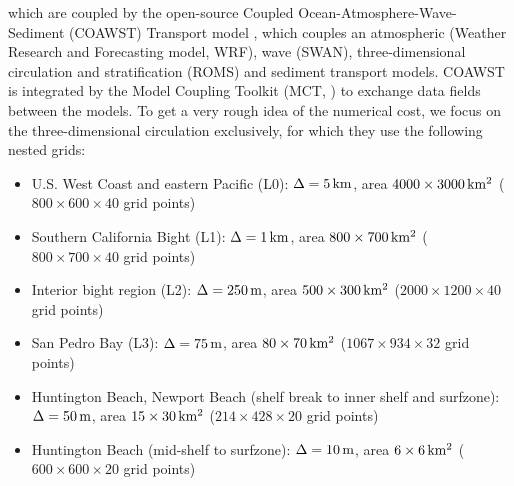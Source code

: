 \documentclass[12pt,a4paper]{article}
\begin{document}
which are coupled by the open-source Coupled Ocean-Atmosphere-Wave-Sediment (COAWST) Transport model \citep{warner2008using,web:coawst}, which couples an atmospheric (Weather Research and Forecasting model, WRF), wave (SWAN), three-dimensional circulation and stratification (ROMS) and sediment transport models. COAWST is integrated by the Model Coupling Toolkit (MCT, \citealt{web:mct}) to exchange data fields between the models. To get a very rough idea of the numerical cost, we focus on the three-dimensional circulation exclusively, for which they use the following nested grids:

\begin{itemize}
	\item U.S. West Coast and eastern Pacific (L0):  $\Delta=5\,\rm km$, area $4000\times3000\,\rm km^2$ ($800\times600\times40$ grid points)
	\item Southern California Bight (L1):  $\Delta=1\,\rm km$, area $800\times700\,\rm km^2$ ($800\times700\times40$ grid points)
	\item Interior bight region (L2): $\Delta=250\,\rm m$, area $500\times300\,\rm km^2$ ($2000\times1200\times40$ grid points)
	\item San Pedro Bay (L3): $\Delta=75\,\rm m$, area $80\times70\,\rm km^2$ ($1067\times934\times32$ grid points)
	\item Huntington Beach, Newport Beach (shelf break to inner shelf and surfzone): $\Delta=50\,\rm m$, area $15\times30\,\rm km^2$ ($214\times428\times20$ grid points)
	\item Huntington Beach (mid-shelf to surfzone): $\Delta=10\,\rm m$, area $6\times6\,\rm km^2$ ($600\times600\times20$ grid points)
\end{itemize}

%
%	
%	
\end{document}
